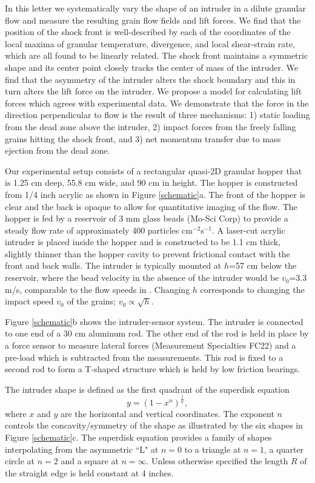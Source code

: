 In this letter we systematically vary the shape of an intruder in a dilute granular flow and measure the resulting grain flow fields and lift forces.  We find that the position of the shock front is well-described by each of the coordinates of the local maxima of granular temperature, divergence, and local shear-strain rate, which are all found to be linearly related.  The shock front maintains a symmetric shape and its center point closely tracks the center of mass of the intruder.  We find that the asymmetry of the intruder alters the shock boundary and this in turn alters the lift force on the intruder. We propose a model for calculating lift forces which agrees with experimental data. We demonstrate that the force in the direction perpendicular to flow is the result of three mechanisms: 1) static loading from the dead zone above the intruder, 2) impact forces from the freely falling grains hitting the shock front, and 3) net momentum transfer due to mass ejection from the dead zone.

Our experimental setup consists of a rectangular quasi-2D granular hopper that is 1.25 cm deep, 55.8 cm wide, and 90 cm in height.  The hopper is constructed from 1/4 inch acrylic as shown in Figure \ref{schematic}a. The front of the hopper is clear and the back is opaque to allow for quantitative imaging of the flow. The hopper is fed by a reservoir of 3 mm glass beads (Mo-Sci Corp) to provide a steady flow rate of approximately 400 particles cm$^{-2}$s$^{-1}$. A laser-cut acrylic intruder is placed inside the hopper and is constructed to be 1.1 cm thick, slightly thinner than the hopper cavity to prevent frictional contact with the front and back walls.  The intruder is typically mounted at $h$=57 cm below the reservoir, where the bead velocity in the absence of the intruder would be $v_{0}$=3.3 m/s, comparable to the flow speeds in \cite{rericha_shocks_2001, amarouchene_speed_2006, clark_steady_2016}. Changing $h$ corresponds to changing the impact speed $v_{0}$ of the grains; $v_{0}\propto \sqrt{h}$.

Figure \ref{schematic}b shows the intruder-sensor system. The intruder is connected to one end of a 30 cm aluminum rod. The other end of the rod is held in place by a force sensor to measure lateral forces (Measurement Specialties FC22) and a pre-load which is subtracted from the measurements. This rod is fixed to a second rod to form a T-shaped structure which is held by low friction bearings.

The intruder shape is defined as the first quadrant of the superdisk equation \cite{jiao_optimal_2009} 
\begin{equation} 
y = (1 - x^n)^{\frac{1}{n}},
\label{intruderEq}
\end{equation}
where $x$ and $y$ are the horizontal and vertical coordinates. The exponent $n$ controls the concavity/symmetry of the shape as illustrated by the six shapes in Figure \ref{schematic}c.  The superdisk equation provides a family of shapes interpolating from the asymmetric ``L" at $n=0$ to a triangle at $n=1$, a quarter circle at $n=2$ and a square at $n=\infty$.  Unless otherwise specified the length $R$ of the straight edge is held constant at 4 inches.   

